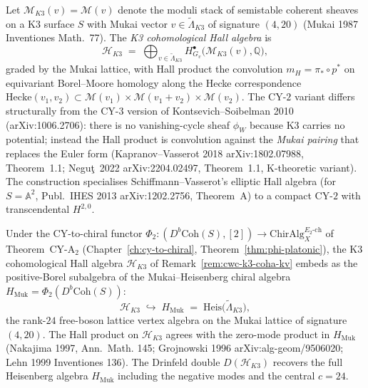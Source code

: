 \begin{remark}
\label{rem:cwc-k3-coha-kv}
Let $\mathcal{M}_{K3}(v) = \mathcal{M}(v)$ denote the moduli stack of
semistable coherent sheaves on a K3 surface $S$ with Mukai vector
$v\in \widetilde{\Lambda}_{K3}$ of signature $(4,20)$ (Mukai 1987
\textup{Inventiones Math.}\ 77). The \emph{K3 cohomological Hall algebra}
is
\[
 \mathcal{H}_{K3}
 \;=\; \bigoplus_{v\in\widetilde{\Lambda}_{K3}}
 H^\bullet_{G_v}\bigl(\mathcal{M}_{K3}(v),\mathbb{Q}\bigr),
\]
graded by the Mukai lattice, with Hall product the convolution
$m_H = \pi_* \circ p^*$ on equivariant Borel--Moore homology along the
Hecke correspondence
$\mathrm{Hecke}(v_1, v_2) \subset \mathcal{M}(v_1)\times\mathcal{M}(v_1+v_2)\times\mathcal{M}(v_2)$.
The CY-$2$ variant differs structurally from the CY-$3$ version of
Kontsevich--Soibelman 2010 (\textup{arXiv:1006.2706}): there is no
vanishing-cycle sheaf $\phi_W$ because K3 carries no potential; instead
the Hall product is convolution against the \emph{Mukai pairing} that
replaces the Euler form (Kapranov--Vasserot 2018
\textup{arXiv:1802.07988}, Theorem~1.1; Negu\c{t}~2022
\textup{arXiv:2204.02497}, Theorem~1.1, K-theoretic variant). The
construction specialises Schiffmann--Vasserot's elliptic Hall algebra
(for $S = \mathbb{A}^2$, Publ.~IHES 2013 \textup{arXiv:1202.2756},
Theorem~A) to a compact CY-$2$ with transcendental $H^{2,0}$.
\end{remark}

\begin{theorem}
\label{thm:cwc-phi-k3-coha}
Under the CY-to-chiral functor
$\Phi_2\colon (D^b\mathrm{Coh}(S), [2]) \to \mathrm{ChirAlg}^{E_2\text{-}\mathrm{ch}}_X$
of Theorem~\textup{CY-A$_2$} (Chapter~\ref{ch:cy-to-chiral},
Theorem~\ref{thm:phi-platonic}), the K3 cohomological Hall algebra
$\mathcal{H}_{K3}$ of
Remark~\textup{\ref{rem:cwc-k3-coha-kv}} embeds as the positive-Borel
subalgebra of the Mukai--Heisenberg chiral algebra
$H_{\mathrm{Muk}} = \Phi_2(D^b\mathrm{Coh}(S))$:
\[
 \mathcal{H}_{K3}
 \;\hookrightarrow\;
 H_{\mathrm{Muk}}
 \;=\;
 \mathrm{Heis}\bigl(\widetilde{\Lambda}_{K3}\bigr),
\]
the rank-$24$ free-boson lattice vertex algebra on the Mukai lattice of
signature $(4,20)$. The Hall product on $\mathcal{H}_{K3}$ agrees with
the zero-mode product in $H_{\mathrm{Muk}}$ (Nakajima 1997,
\textup{Ann.~Math.} 145; Grojnowski 1996 \textup{arXiv:alg-geom/9506020};
Lehn 1999 \textup{Inventiones} 136). The Drinfeld double
$D(\mathcal{H}_{K3})$ recovers the full Heisenberg algebra
$H_{\mathrm{Muk}}$ including the negative modes and the central $c=24$.
\end{theorem}

